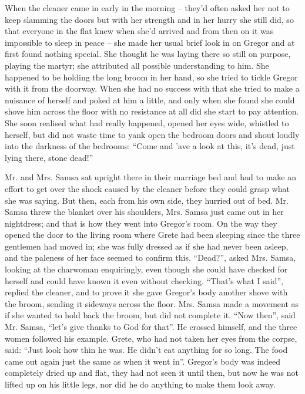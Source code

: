 When the cleaner came in early in the morning – they’d often asked her
not to keep slamming the doors but with her strength and in her hurry
she still did, so that everyone in the flat knew when she’d arrived and
from then on it was impossible to sleep in peace – she made her usual
brief look in on Gregor and at first found nothing special. She thought
he was laying there so still on purpose, playing the martyr; she
attributed all possible understanding to him. She happened to be
holding the long broom in her hand, so she tried to tickle Gregor with
it from the doorway. When she had no success with that she tried to
make a nuisance of herself and poked at him a little, and only when she
found she could shove him across the floor with no resistance at all
did she start to pay attention. She soon realised what had really
happened, opened her eyes wide, whistled to herself, but did not waste
time to yank open the bedroom doors and shout loudly into the darkness
of the bedrooms: “Come and ’ave a look at this, it’s dead, just lying
there, stone dead!”

Mr. and Mrs. Samsa sat upright there in their marriage bed and had to
make an effort to get over the shock caused by the cleaner before they
could grasp what she was saying. But then, each from his own side, they
hurried out of bed. Mr. Samsa threw the blanket over his shoulders,
Mrs. Samsa just came out in her nightdress; and that is how they went
into Gregor’s room. On the way they opened the door to the living room
where Grete had been sleeping since the three gentlemen had moved in;
she was fully dressed as if she had never been asleep, and the paleness
of her face seemed to confirm this. “Dead?”, asked Mrs. Samsa, looking
at the charwoman enquiringly, even though she could have checked for
herself and could have known it even without checking. “That’s what I
said”, replied the cleaner, and to prove it she gave Gregor’s body
another shove with the broom, sending it sideways across the floor.
Mrs. Samsa made a movement as if she wanted to hold back the broom, but
did not complete it. “Now then”, said Mr. Samsa, “let’s give thanks to
God for that”. He crossed himself, and the three women followed his
example. Grete, who had not taken her eyes from the corpse, said: “Just
look how thin he was. He didn’t eat anything for so long. The food came
out again just the same as when it went in”. Gregor’s body was indeed
completely dried up and flat, they had not seen it until then, but now
he was not lifted up on his little legs, nor did he do anything to make
them look away.

